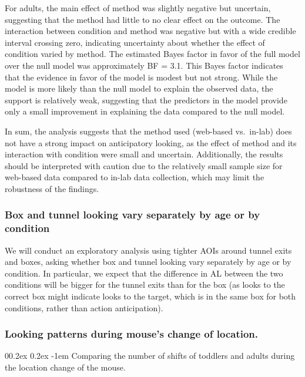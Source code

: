 \documentclass[
  english,
  man,floatsintext]{apa6}
\makeatletter
\let\oldparagraph\paragraph
\renewcommand{\paragraph}[1]{\oldparagraph{#1}\mbox{}}
\renewcommand{\paragraph}{\@startsection{paragraph}{4}{\parindent}%
  {0\baselineskip \@plus 0.2ex \@minus 0.2ex}%
  {-1em}%
  {\normalfont\normalsize\bfseries\itshape\typesectitle}}
\makeatother
\begin{document}
For adults, the main effect of method was slightly negative but uncertain, suggesting that the method had little to no clear effect on the outcome. The interaction between condition and method was negative but with a wide credible interval crossing zero, indicating uncertainty about whether the effect of condition varied by method. The estimated Bayes factor in favor of the full model over the null model was approximately BF = 3.1. This Bayes factor indicates that the evidence in favor of the model is modest but not strong. While the model is more likely than the null model to explain the observed data, the support is relatively weak, suggesting that the predictors in the model provide only a small improvement in explaining the data compared to the null model.

In sum, the analysis suggests that the method used (web-based vs.~in-lab) does not have a strong impact on anticipatory looking, as the effect of method and its interaction with condition were small and uncertain. Additionally, the results should be interpreted with caution due to the relatively small sample size for web-based data compared to in-lab data collection, which may limit the robustness of the findings.

\hypertarget{box-and-tunnel-looking-vary-separately-by-age-or-by-condition}{%
\subsubsection{Box and tunnel looking vary separately by age or by condition}\label{box-and-tunnel-looking-vary-separately-by-age-or-by-condition}}

We will conduct an exploratory analysis using tighter AOIs around tunnel exits and boxes, asking whether box and tunnel looking vary separately by age or by condition. In particular, we expect that the difference in AL between the two conditions will be bigger for the tunnel exits than for the box (as looks to the correct box might indicate looks to the target, which is in the same box for both conditions, rather than action anticipation).

\hypertarget{looking-patterns-during-mouses-change-of-location.}{%
\subsubsection{Looking patterns during mouse's change of location.}\label{looking-patterns-during-mouses-change-of-location.}}

\hypertarget{comparing-the-number-of-shifts-of-toddlers-and-adults-during-the-location-change-of-the-mouse.}{%
\paragraph{Comparing the number of shifts of toddlers and adults during the location change of the mouse.}\label{comparing-the-number-of-shifts-of-toddlers-and-adults-during-the-location-change-of-the-mouse.}}
\end{document}

